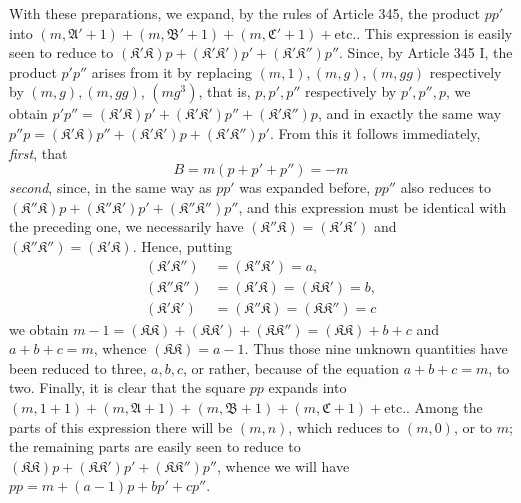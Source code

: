With these preparations, we expand, by the rules of Article 345, the product \(pp'\) into \((m,\mathfrak A'+1)+(m,\mathfrak B'+1)+(m,\mathfrak C'+1)+\text{etc.}\). This expression is easily seen to reduce to \((\mathfrak K'\mathfrak K)p+(\mathfrak K'\mathfrak K')p'+(\mathfrak K'\mathfrak K'')p''\). Since, by Article 345 I, the product \(p'p''\) arises from it by replacing \((m,1),\allowbreak (m,g),\allowbreak (m,gg)\) respectively by \((m,g),\allowbreak (m,gg)\), \((mg^3)\), that is, \(p,\allowbreak p',\allowbreak p''\) respectively by \(p',\allowbreak p'',\allowbreak p\), we obtain \(p'p''=(\mathfrak K'\mathfrak K)p'+(\mathfrak K'\mathfrak K')p''+(\mathfrak K'\mathfrak K'')p\), and in exactly the same way \(p''p=(\mathfrak K'\mathfrak K)p''+(\mathfrak K'\mathfrak K')p+(\mathfrak K'\mathfrak K'')p'\). From this it follows immediately, \textit{first}, that \[B=m(p+p'+p'')=-m\] \textit{second}, since, in the same way as \(pp'\) was expanded before, \(pp''\) also reduces to \((\mathfrak K''\mathfrak K)p+(\mathfrak K''\mathfrak K')p'+(\mathfrak K''\mathfrak K'')p''\), and this expression must be identical with the preceding one, we necessarily have \((\mathfrak K''\mathfrak K)=(\mathfrak K'\mathfrak K')\) and \((\mathfrak K''\mathfrak K'')=(\mathfrak K'\mathfrak K)\). Hence, putting \[\begin{aligned}(\mathfrak K'\mathfrak K'')&=(\mathfrak K''\mathfrak K')=a,\\(\mathfrak K''\mathfrak K'')&=(\mathfrak K'\mathfrak K)=(\mathfrak K\mathfrak K')=b,\\(\mathfrak K'\mathfrak K')&=(\mathfrak K''\mathfrak K)=(\mathfrak K\mathfrak K'')=c\end{aligned}\] we obtain \(m-1=(\mathfrak K\mathfrak K)+(\mathfrak K\mathfrak K')+(\mathfrak K\mathfrak K'')=(\mathfrak K\mathfrak K)+b+c\) and \(a+b+c=m\), whence \((\mathfrak K\mathfrak K)=a-1\). Thus those nine unknown quantities have been reduced to three, \(a,\allowbreak b,\allowbreak c\), or rather, because of the equation \(a+b+c=m\), to two. Finally, it is clear that the square \(pp\) expands into \((m,1+1)+(m,\mathfrak A+1)+(m,\mathfrak B+1)+(m,\mathfrak C+1)+\text{etc.}\). Among the parts of this expression there will be \((m,n)\), which reduces to \((m,0)\), or to \(m\); the remaining parts are easily seen to reduce to \((\mathfrak K\mathfrak K)p+(\mathfrak K\mathfrak K')p'+(\mathfrak K\mathfrak K'')p''\), whence we will have \(pp=m+(a-1)p+bp'+cp''\).

